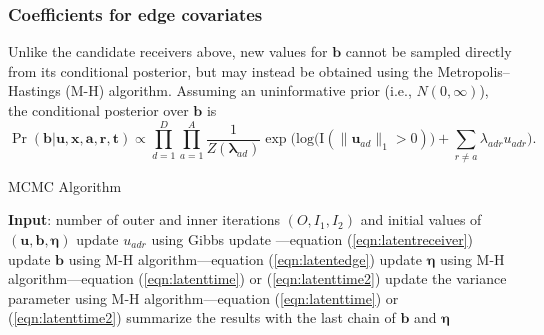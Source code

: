\documentclass[ba]{imsart}
\def\spacingset#1{\renewcommand{\baselinestretch}%
	{#1}\small\normalsize} \spacingset{1}
\numberwithin{equation}{section}
\theoremstyle{plain}
\begin{document}
\subsubsection{Coefficients for edge covariates}
Unlike the candidate receivers above, new values for $\boldsymbol{b}$ cannot be sampled directly from its conditional posterior, but may instead be obtained using the Metropolis--Hastings (M-H) algorithm. Assuming an uninformative prior (i.e., $N({0},\infty)$), the conditional posterior over $\boldsymbol{b}$ is
\begin{equation}
\Pr(\boldsymbol{b}| \boldsymbol{u}, \boldsymbol{x}, \boldsymbol{a}, \boldsymbol{r},\boldsymbol{t})\propto \prod_{d=1}^D
\prod_{a=1}^A \frac{1}{Z(\boldsymbol{\lambda}_{ad})}\exp\Big(\mbox{log}\big(\text{I}( \lVert \boldsymbol{u}_{ad}\rVert_1 > 0)\big) + \sum\limits_{r \neq a} \lambda_{adr}u_{adr}\Big).
\label{eqn:latentedge}
\end{equation}
\begin{algorithm}[!t]
	\spacingset{1}
	\SetAlgoLined
	\caption{MCMC Algorithm}
	\begin{algorithmic}
		\STATE \textbf{Input}: number of outer and inner iterations $(O, I_1, I_2)$ and initial values of $(\boldsymbol{u}, \boldsymbol{b}, \boldsymbol{\eta})$
		\vskip 0.1in
		\STATE update $u_{adr}$ using Gibbs update ---equation (\ref{eqn:latentreceiver})
		\ENDFOR
		\ENDFOR
		\ENDFOR
		\STATE update $\boldsymbol{b}$ using M-H algorithm---equation (\ref{eqn:latentedge})
		\ENDFOR
		\STATE update $\boldsymbol{\eta}$ using M-H algorithm---equation (\ref{eqn:latenttime}) or (\ref{eqn:latenttime2}) 
		\ENDFOR
		\STATE update the variance parameter using M-H algorithm---equation (\ref{eqn:latenttime}) or (\ref{eqn:latenttime2}) 
		\ENDIF
		\ENDFOR
		\STATE	summarize the results with the last chain of $\boldsymbol{b}$ and $\boldsymbol{\eta}$
	\end{algorithmic}
	\label{alg:MCMC}
\end{algorithm}
\end{document}
